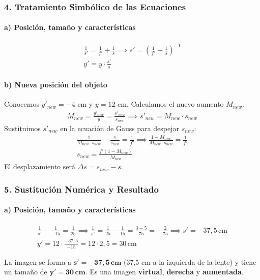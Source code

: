 \subsubsection*{4. Tratamiento Simbólico de las Ecuaciones}
\paragraph*{a) Posición, tamaño y características}
\begin{gather}
    \frac{1}{s'} = \frac{1}{f'} + \frac{1}{s} \implies s' = \left(\frac{1}{f'} + \frac{1}{s}\right)^{-1} \\
    y' = y \cdot \frac{s'}{s}
\end{gather}
\paragraph*{b) Nueva posición del objeto}
Conocemos $y'_{new} = -4$ cm y $y=12$ cm. Calculamos el nuevo aumento $M_{new}$.
\begin{gather}
    M_{new} = \frac{y'_{new}}{y} = \frac{s'_{new}}{s_{new}} \implies s'_{new} = M_{new} \cdot s_{new}
\end{gather}
Sustituimos $s'_{new}$ en la ecuación de Gauss para despejar $s_{new}$:
\begin{gather}
    \frac{1}{M_{new} \cdot s_{new}} - \frac{1}{s_{new}} = \frac{1}{f'} \implies \frac{1-M_{new}}{M_{new} \cdot s_{new}} = \frac{1}{f'} \nonumber \\
    s_{new} = \frac{f'(1-M_{new})}{M_{new}}
\end{gather}
El desplazamiento será $\Delta s = s_{new} - s$.

\subsubsection*{5. Sustitución Numérica y Resultado}
\paragraph*{a) Posición, tamaño y características}
\begin{gather}
    \frac{1}{s'} - \frac{1}{-15} = \frac{1}{25} \implies \frac{1}{s'} = \frac{1}{25} - \frac{1}{15} = \frac{3-5}{75} = -\frac{2}{75} \implies s' = -37,5 \, \text{cm} \\
    y' = 12 \cdot \frac{-37,5}{-15} = 12 \cdot 2,5 = 30 \, \text{cm}
\end{gather}
\begin{cajaresultado}
La imagen se forma a $\boldsymbol{s'=-37,5 \, \textbf{cm}}$ (37,5 cm a la izquierda de la lente) y tiene un tamaño de $\boldsymbol{y'=30 \, \textbf{cm}}$.
Es una imagen \textbf{virtual}, \textbf{derecha} y \textbf{aumentada}.
\end{cajaresultado}

